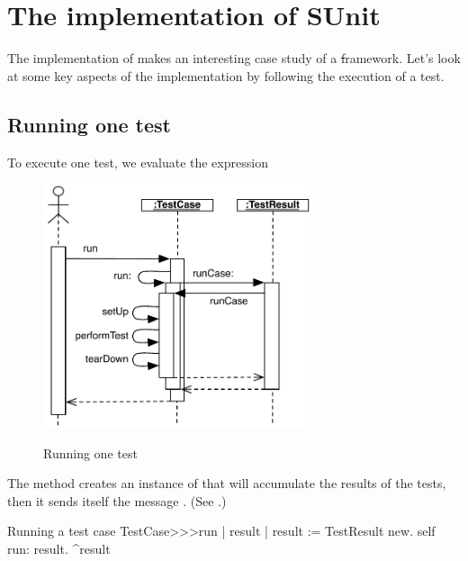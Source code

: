 \documentclass[a4paper,10pt,twoside]{book}
\begin{document}
\section{The implementation of SUnit}

The implementation of \sunit makes an interesting case study of a \st framework.
Let's look at some key aspects of the implementation by following the
execution of a test.
\subsection{Running one test}

To execute one test, we evaluate the expression


\begin{figure}[tbh]
  \begin{center}
		{\includegraphics[width=0.7\textwidth]{sunit-scenario}}
	\caption{Running one test}
  \end{center}
\end{figure}

The method  creates an instance of
 that will accumulate the results of the
tests, then it sends itself the message .
(See .)

\begin{method}[tastecaserun]{Running a test case}
TestCase>>>run
	| result |
	result := TestResult new.
	self run: result.
	^result
\end{method}

\end{document}

